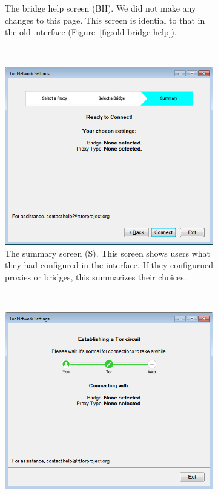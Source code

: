 \documentclass[USenglish,oneside,twocolumn]{article}
\begin{document}
\begin{figure}
\begin{subfigure}[b]{0.30\textwidth}
	\centering\captionsetup{width=1.5\linewidth}%
	\caption{The bridge help screen (BH). We did not make any changes to this page. This screen is idential to that in the old interface (Figure~\ref{fig:old-bridge-help}).}
	\label{fig:new-bridge-help}
\end{subfigure}
~~~~~~~~~~
\begin{subfigure}[b]{0.30\textwidth}
	\includegraphics[width=\textwidth]{screenshots/NEW-summary.png}
	\centering\captionsetup{width=1.5\linewidth}%
	\caption{The summary screen (S). This screen shows users what they had configured in the interface. If they  configurued proxies or bridges, this summarizes their choices.}
	\label{fig:new-summary}
\end{subfigure}
~~~~~~~~~~~~~~~~~~~~~~~~~
\begin{subfigure}[b]{0.30\textwidth}
	\includegraphics[width=\textwidth]{screenshots/NEW-progress.png}

\end{subfigure}
\end{figure}
\end{document}
